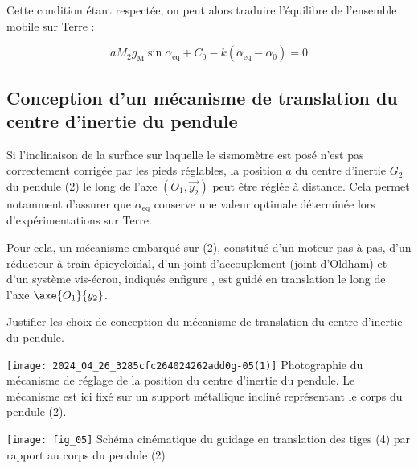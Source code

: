 \ifprof
\else

Cette condition étant respectée, on peut alors traduire l'équilibre de l'ensemble mobile sur Terre :

$$
a M_{2} g_{\mathrm{M}} \sin \alpha_{\mathrm{eq}}+C_{0}-k\left(\alpha_{\mathrm{eq}}-\alpha_{0}\right)=0 %
$$
\fi

\subsection{Conception d'un mécanisme de translation du centre d'inertie du pendule}
\ifprof
\else
Si l'inclinaison de la surface sur laquelle le sismomètre est posé n'est pas correctement corrigée par les pieds réglables, la position $a$ du centre d'inertie $G_{2}$ du pendule (2) le long de l'axe $\left(O_{1}, \overrightarrow{y_{2}}\right)$ peut être réglée à distance. Cela permet notamment d'assurer que $\alpha_{\mathrm{eq}}$ conserve une valeur optimale déterminée lors d'expérimentations sur Terre.

Pour cela, un mécanisme embarqué sur (2), constitué d'un moteur pas-à-pas, d'un réducteur à train épicycloïdal, d'un joint d'accouplement (joint d'Oldham) et d'un système vis-écrou, indiqués enfigure \label{ccmp2023_fig_04}, est guidé en translation le long de l'axe  $\axe{O_1}{y_2}$.
\fi

\begin{obj}
Justifier les choix de conception du mécanisme de translation du centre d'inertie du pendule.
\end{obj}

\ifprof
\else

\begin{minipage}[c]{.45\linewidth}
    \texttt{[image: 2024\_04\_26\_3285cfc264024262add0g-05(1)]}
     {\label{ccmp2023_fig_04} Photographie du mécanisme de réglage de la position du centre d'inertie du pendule. Le mécanisme est ici fixé sur un support métallique incliné représentant le corps du pendule (2).}
\end{minipage}
\hfill
\begin{minipage}[c]{.45\linewidth}
\begin{center}
        \texttt{[image: fig\_05]}
         {\label{ccmp2023_fig_05} Schéma cinématique du guidage en translation des tiges (4) par rapport au corps du pendule (2)}
\end{center}
\end{minipage}


